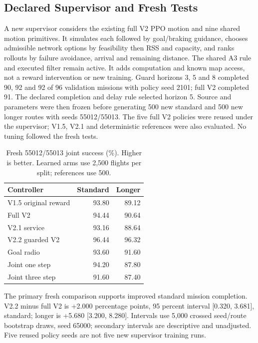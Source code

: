 \subsection{Declared Supervisor and Fresh Tests}
A new supervisor considers the existing full V2 PPO motion and nine shared motion primitives. It simulates each followed by goal/braking guidance, chooses admissible network options by feasibility then RSS and capacity, and ranks rollouts by failure avoidance, arrival and remaining distance. The shared A3 rule and executed filter remain active. It adds computation and known map access, not a reward intervention or new training.
Guard horizons 3, 5 and 8 completed 90, 92 and 92 of 96 validation missions with policy seed 2101; full V2 completed 91. The declared completion and delay rule selected horizon 5. Source and parameters were then frozen before generating 500 new standard and 500 new longer routes with seeds 55012/55013. The five full V2 policies were reused under the supervisor; V1.5, V2.1 and deterministic references were also evaluated. No tuning followed the fresh tests.
\begin{table}[!t]\centering\small
\caption{Fresh 55012/55013 joint success (\%). Higher is better. Learned arms use 2,500 flights per split; references use 500.}
\begin{tabular}{lrr}\toprule Controller & Standard & Longer\\\midrule
V1.5 original reward & 93.80 & 89.12\\
Full V2 & 94.44 & 90.64\\
V2.1 service & 93.16 & 88.64\\
V2.2 guarded V2 & 96.44 & 96.32\\
Goal radio & 93.60 & 91.60\\
Joint one step & 94.20 & 87.80\\
Joint three step & 91.60 & 87.40\\
\bottomrule\end{tabular}\end{table}
The primary fresh comparison supports improved standard mission completion. V2.2 minus full V2 is +2.000 percentage points, 95 percent interval [0.320, 3.681], standard; longer is +5.680 [3.200, 8.280]. Intervals use 5,000 crossed seed/route bootstrap draws, seed 65000; secondary intervals are descriptive and unadjusted. Five reused policy seeds are not five new supervisor training runs.
